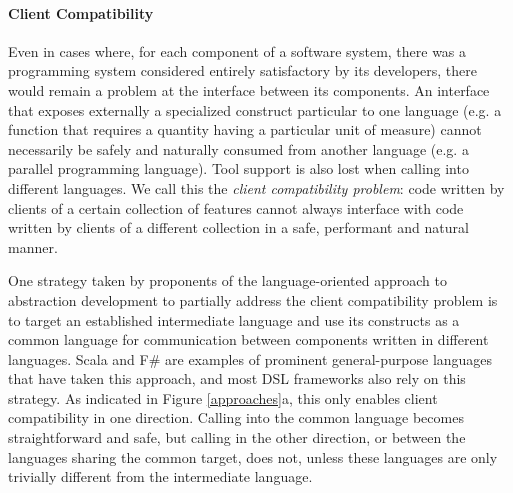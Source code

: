 \paragraph{Client Compatibility} Even in cases where, for each component of a software system, there was a programming system considered entirely satisfactory by its developers, there would remain a problem at the interface between its components. An interface that exposes externally a specialized construct particular to one language (e.g. a function that requires a quantity having a particular unit of measure) cannot necessarily be safely and naturally consumed from another language (e.g. a parallel programming language). Tool support is also lost when calling into different languages. We call this the \emph{client compatibility problem}: code written by clients of a certain collection of features cannot always interface with code written by clients of a different collection  in a safe, performant and natural manner.

One strategy taken by proponents of the {language-oriented approach} to abstraction development \cite{journals/stp/Ward94} to partially address the client compatibility problem is to  target an established intermediate language and use its constructs as a common language for communication between components written in different languages. Scala \cite{200464/IC} and F\# \cite{pickering2007foundations} are examples of prominent general-purpose languages that have taken this approach, and most DSL frameworks also rely on this strategy. As indicated in Figure \ref{approaches}a, this only enables client compatibility in one direction. Calling into the common language becomes straightforward and safe, but calling in the other direction, or between the languages sharing the common target, does not, unless these languages are only trivially different from the intermediate language. 

